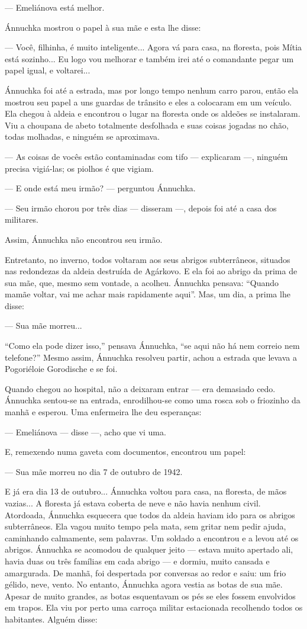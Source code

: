 --- Emeliánova está melhor.

Ánnuchka mostrou o papel à sua mãe e esta lhe disse:

--- Você, filhinha, é muito inteligente... Agora vá para casa, na
floresta, pois Mítia está sozinho... Eu logo vou melhorar e também irei
até o comandante pegar um papel igual, e voltarei...

Ánnuchka foi até a estrada, mas por longo tempo nenhum carro parou,
então ela mostrou seu papel a uns guardas de trânsito e eles a colocaram
em um veículo. Ela chegou à aldeia e encontrou o lugar na floresta onde
os aldeões se instalaram. Viu a choupana de abeto totalmente desfolhada
e suas coisas jogadas no chão, todas molhadas, e ninguém se aproximava.

--- As coisas de vocês estão contaminadas com tifo --- explicaram ---,
ninguém precisa vigiá-las; os piolhos é que vigiam.

--- E onde está meu irmão? --- perguntou Ánnuchka.

--- Seu irmão chorou por três dias --- disseram ---, depois foi até a
casa dos militares.

Assim, Ánnuchka não encontrou seu irmão.

Entretanto, no inverno, todos voltaram aos seus abrigos subterrâneos,
situados nas redondezas da aldeia destruída de Agárkovo. E ela foi ao
abrigo da prima de sua mãe, que, mesmo sem vontade, a acolheu. Ánnuchka
pensava: ``Quando mamãe voltar, vai me achar mais rapidamente aqui''.
Mas, um dia, a prima lhe disse:

--- Sua mãe morreu...

``Como ela pode dizer isso,'' pensava Ánnuchka, ``se aqui não há nem
correio nem telefone?'' Mesmo assim, Ánnuchka resolveu partir, achou a
estrada que levava a Pogoriéloie Gorodische e se foi.

Quando chegou ao hospital, não a deixaram entrar --- era demasiado cedo.
Ánnuchka sentou-se na entrada, enrodilhou-se como uma rosca sob o
friozinho da manhã e esperou. Uma enfermeira lhe deu esperanças:

--- Emeliánova --- disse ---, acho que vi uma.

E, remexendo numa gaveta com documentos, encontrou um papel:

--- Sua mãe morreu no dia 7 de outubro de 1942.

E já era dia 13 de outubro... Ánnuchka voltou para casa, na floresta, de
mãos vazias... A floresta já estava coberta de neve e não havia nenhum
civil. Atordoada, Ánnuchka esquecera que todos da aldeia haviam ido para
os abrigos subterrâneos. Ela vagou muito tempo pela mata, sem gritar nem
pedir ajuda, caminhando calmamente, sem palavras. Um soldado a encontrou
e a levou até os abrigos. Ánnuchka se acomodou de qualquer jeito ---
estava muito apertado ali, havia duas ou três famílias em cada abrigo
--- e dormiu, muito cansada e amargurada. De manhã, foi despertada por
conversas ao redor e saiu: um frio gélido, neve, vento. No entanto,
Ánnuchka agora vestia as botas de sua mãe. Apesar de muito grandes, as
botas esquentavam os pés se eles fossem envolvidos em trapos. Ela viu
por perto uma carroça militar estacionada recolhendo todos os
habitantes. Alguém disse:

